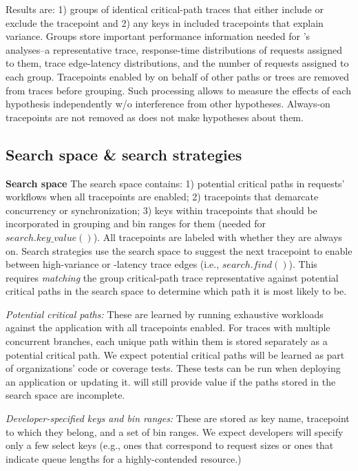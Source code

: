 Results are: 1) groups of identical critical-path
traces that either include or exclude the tracepoint and 2) any keys
in included tracepoints that explain variance.  Groups store important
performance information needed for \STAIF{}'s analyses--a
representative trace, response-time distributions of requests assigned
to them, trace edge-latency distributions, and the number of requests
assigned to each group.  Tracepoints enabled by \STAIF{} on behalf of
other paths or trees are removed from traces before grouping.  Such
processing allows \STAIF{} to measure the effects of each hypothesis
independently w/o interference from other hypotheses.  Always-on
tracepoints are not removed as \STAIF{} does not make hypotheses about
them.

\subsection{Search space \& search strategies}
\label{sec:design:search_strategies}

\noindent\textbf{Search space} The search space contains: 1) potential
critical paths in requests' workflows when all tracepoints are
enabled; 2) tracepoints that demarcate concurrency or
synchronization; 3) keys within tracepoints that should be
incorporated in grouping and bin ranges for them (needed for $search.key\_value()$).   %
All tracepoints are labeled with whether they are always on. %
Search strategies use the search space to suggest the next tracepoint to
enable between high-variance or -latency trace edges (i.e.,
$search.find()$).  This requires \textit{matching} the group
critical-path trace representative against potential critical paths in
the search space to determine which path it is most likely to be.

\textit{Potential critical paths:} These are learned by
running exhaustive workloads against the application with all
tracepoints enabled. For traces with multiple
concurrent branches, each unique path within them is stored separately as a
potential critical path. We expect potential critical paths will be
learned as part of organizations' code or coverage tests.  These tests
can be run when deploying an application or updating it.  
\STAIF{} will still provide value if the paths stored in the
search space are incomplete.

\textit{Developer-specified keys and bin ranges:} These are stored as
key name, tracepoint to which they belong, and a set
of bin ranges.  We expect developers will specify only a few select
keys (e.g., ones that correspond to request sizes or ones that
indicate queue lengths for a highly-contended resource.)

